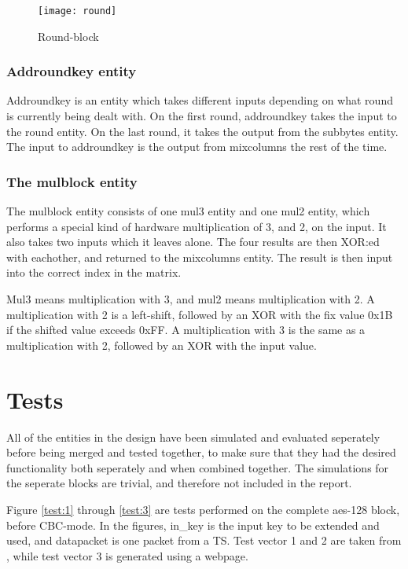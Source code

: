 \begin{figure}[h!]
  \centering
  \texttt{[image: round]}
  \caption{Round-block}
  \label{block:round}
\end{figure}

\subsubsection{Addroundkey entity}
Addroundkey is an entity which takes different inputs depending on 
what round is currently being dealt with. On the first round, 
addroundkey takes the input to the round entity. On the last round, it 
takes the output from the subbytes entity. The input to addroundkey is 
the output from mixcolumns the rest of the time.

\subsubsection{The mulblock entity}
The mulblock entity consists of one mul3 entity and one mul2 entity, 
which performs a special kind of hardware multiplication of 3, and 2, 
on the input. It also takes two inputs which it leaves alone. The four 
results are then XOR:ed with eachother, and returned to the mixcolumns 
entity. The result is then input into the correct index in the matrix. 

Mul3 means multiplication with 3, and mul2 means multiplication with 2. 
A multiplication with 2 is a left-shift, followed by an XOR with the 
fix value 0x1B if the shifted value exceeds 0xFF. A multiplication with 
3 is the same as a multiplication with 2, followed by an XOR with the 
input value.

\section{Tests}
All of the entities in the design have been simulated and evaluated 
seperately before being merged and tested together, to make sure that 
they had the desired functionality both seperately and when combined 
together. The simulations for the seperate blocks are trivial, and 
therefore not included in the report.

Figure \ref{test:1} through \ref{test:3} are tests performed on the 
complete aes-128 block, before CBC-mode. In the figures, in\_key is the 
input key to be extended and used, and datapacket is one packet from a 
TS. Test vector 1 and 2 are taken from \citep{AES:2001}, while test 
vector 3 is generated using a webpage.


